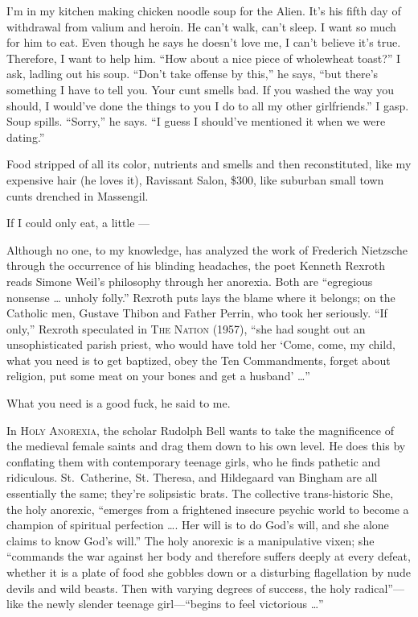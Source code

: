 \documentclass[
]{memoir}
\begin{document}
I'm in my kitchen making chicken noodle soup for the Alien. It's his
fifth day of withdrawal from valium and heroin. He can't walk, can't
sleep. I want so much for him to eat. Even though he says he doesn't
love me, I can't believe it's true. Therefore, I want to help him. ``How
about a nice piece of wholewheat toast?'' I ask, ladling out his soup.
``Don't take offense by this,'' he says, ``but there's something I have
to tell you. Your cunt smells bad. If you washed the way you should, I
would've done the things to you I do to all my other girlfriends.'' I
gasp. Soup spills. ``Sorry,'' he says. ``I guess I should've mentioned
it when we were dating.''

Food stripped of all its color, nutrients and smells and then
reconstituted, like my expensive hair (he loves it), Ravissant Salon,
\$300, like suburban small town cunts drenched in Massengil.

If I could only eat, a little ---

Although no one, to my knowledge, has analyzed the work of Frederich
Nietzsche through the occurrence of his blinding headaches, the poet
Kenneth Rexroth reads Simone Weil's philosophy through her anorexia.
Both are ``egregious nonsense \ldots{} unholy folly.'' Rexroth puts lays
the blame where it belongs; on the Catholic men, Gustave Thibon and
Father Perrin, who took her seriously. ``If only,'' Rexroth speculated
in \textsc{The Nation} (1957), ``she had sought out an unsophisticated
parish priest, who would have told her `Come, come, my child, what you
need is to get baptized, obey the Ten Commandments, forget about
religion, put some meat on your bones and get a husband' \ldots{}''

What you need is a good fuck, he said to me.

In \textsc{Holy Anorexia}, the scholar Rudolph Bell wants to take the
magnificence of the medieval female saints and drag them down to his own
level. He does this by conflating them with contemporary teenage girls,
who he finds pathetic and ridiculous. St.~Catherine, St. Theresa, and
Hildegaard van Bingham are all essentially the same; they're solipsistic
brats. The collective trans-historic She, the holy anorexic, ``emerges
from a frightened insecure psychic world to become a champion of
spiritual perfection \ldots{}. Her will is to do God's will, and she
alone claims to know God's will.'' The holy anorexic is a manipulative
vixen; she ``commands the war against her body and therefore suffers
deeply at every defeat, whether it is a plate of food she gobbles down
or a disturbing flagellation by nude devils and wild beasts. Then with
varying degrees of success, the holy radical''---like the newly slender
teenage girl---``begins to feel victorious \ldots{}''
\end{document}
